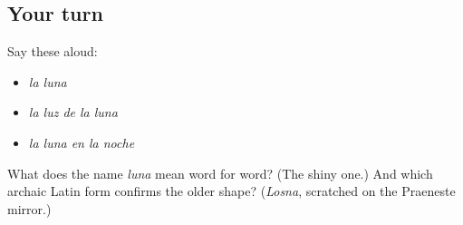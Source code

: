 \subsection*{Your turn}
Say these aloud:

\begin{itemize}
\raggedright
  \item \emph{la luna}
  \item \emph{la luz de la luna}
  \item \emph{la luna en la noche}
\end{itemize}

\begin{tcolorbox}[breakable,colback=teal!4,colframe=teal!35!black,title={Before you move on}]
What does the name \emph{luna} mean word for word? (The shiny one.) And which archaic Latin form confirms the older shape? (\emph{Losna}, scratched on the Praeneste mirror.)
\end{tcolorbox}
